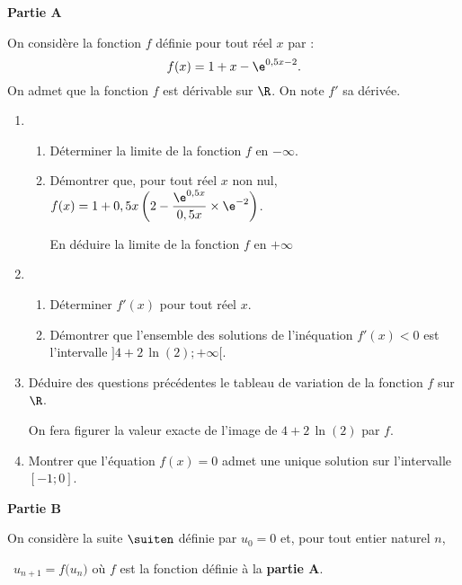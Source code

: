 \textbf{\large Partie A}

\medskip

On considère la fonction $f$ définie pour tout réel $x$ par : \[ f(x)=1+x-\e^{0,5x-2}. \]
%
On admet que la fonction $f$ est dérivable sur $\R$. On note $f'$ sa dérivée.

\begin{enumerate}
	\item 
	\begin{enumerate}
		\item Déterminer la limite de la fonction $f$ en $-\infty$.
		\item Démontrer que, pour tout réel $x$ non nul, $f(x)=1+0,5x\left( 2 - \dfrac{\e^{0,5x}}{0,5x} \times \e^{-2} \right)$.
		
		En déduire la limite de la fonction $f$ en $+\infty$
	\end{enumerate}
	\item 
	\begin{enumerate}
		\item Déterminer $f'(x)$ pour tout réel $x$.
		\item Démontrer que l'ensemble des solutions de l'inéquation $f'(x)<0$ est l'intervalle $]4+2\,\ln(2);+\infty[$.
	\end{enumerate}
	\item Déduire des questions précédentes le tableau de variation de la fonction $f$ sur $\R$.
	
	On fera figurer la valeur exacte de l'image de $4+2\,\ln(2)$ par $f$.
	\item Montrer que l'équation $f(x)=0$ admet une unique solution sur l'intervalle $[-1;0]$.
\end{enumerate}

\textbf{\large Partie B}

\medskip

On considère la suite $\suiten$ définie par $u_0=0$ et, pour tout entier naturel $n$, 

\smallskip

\hfill~$u_{n+1}=f\big(u_n\big)$ où $f$ est la fonction définie à la \textbf{partie A}.\hfill~

